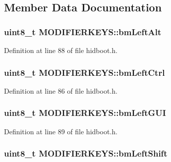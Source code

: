\subsection{\-Member \-Data \-Documentation}
\hypertarget{struct_m_o_d_i_f_i_e_r_k_e_y_s_a9831dc1526813627895b9244e5d85d83}{
\subsubsection[{bm\-Left\-Alt}]{\setlength{\rightskip}{0pt plus 5cm}uint8\-\_\-t {\bf \-M\-O\-D\-I\-F\-I\-E\-R\-K\-E\-Y\-S\-::bm\-Left\-Alt}}}\label{struct_m_o_d_i_f_i_e_r_k_e_y_s_a9831dc1526813627895b9244e5d85d83}


\-Definition at line 88 of file hidboot.\-h.

\hypertarget{struct_m_o_d_i_f_i_e_r_k_e_y_s_a97b52e09ef7038a7e92b0e2993de3456}{
\subsubsection[{bm\-Left\-Ctrl}]{\setlength{\rightskip}{0pt plus 5cm}uint8\-\_\-t {\bf \-M\-O\-D\-I\-F\-I\-E\-R\-K\-E\-Y\-S\-::bm\-Left\-Ctrl}}}\label{struct_m_o_d_i_f_i_e_r_k_e_y_s_a97b52e09ef7038a7e92b0e2993de3456}


\-Definition at line 86 of file hidboot.\-h.

\hypertarget{struct_m_o_d_i_f_i_e_r_k_e_y_s_acb93172b755fe9c666fee166738089fe}{
\subsubsection[{bm\-Left\-G\-U\-I}]{\setlength{\rightskip}{0pt plus 5cm}uint8\-\_\-t {\bf \-M\-O\-D\-I\-F\-I\-E\-R\-K\-E\-Y\-S\-::bm\-Left\-G\-U\-I}}}\label{struct_m_o_d_i_f_i_e_r_k_e_y_s_acb93172b755fe9c666fee166738089fe}


\-Definition at line 89 of file hidboot.\-h.

\hypertarget{struct_m_o_d_i_f_i_e_r_k_e_y_s_acc2203f0a2cfd97605ba55698a74fef0}{
\subsubsection[{bm\-Left\-Shift}]{\setlength{\rightskip}{0pt plus 5cm}uint8\-\_\-t {\bf \-M\-O\-D\-I\-F\-I\-E\-R\-K\-E\-Y\-S\-::bm\-Left\-Shift}}}\label{struct_m_o_d_i_f_i_e_r_k_e_y_s_acc2203f0a2cfd97605ba55698a74fef0}


